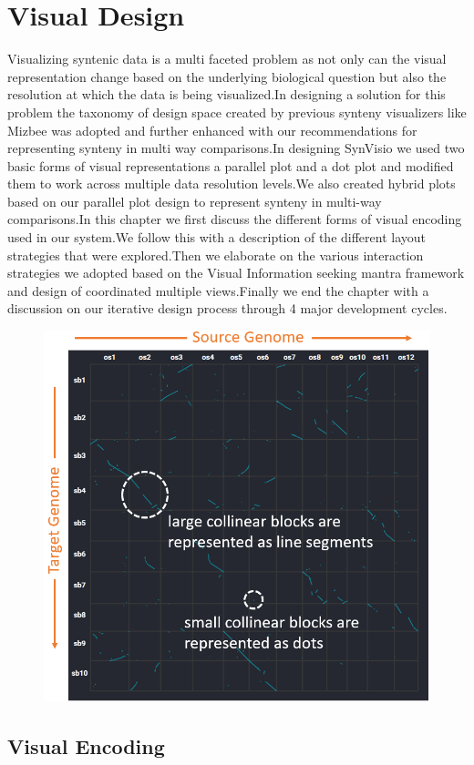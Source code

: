 \chapter{Visual Design}

Visualizing syntenic data is a multi faceted problem as not only can the visual representation change based on the underlying biological question but also the resolution at which the data is being visualized.In designing a solution for this problem the taxonomy of design space created by previous synteny visualizers like Mizbee \cite{Meyer2009} was adopted and further enhanced with our recommendations for representing synteny in multi way comparisons.In designing SynVisio we used two basic forms of visual representations a parallel plot and a dot plot and modified them to work across multiple data resolution levels.We also created hybrid plots based on our parallel plot design to represent synteny in multi-way comparisons.In this chapter we first discuss the different forms of visual encoding used in our system.We follow this with a  description of the different layout strategies that were explored.Then we elaborate on the various interaction strategies we adopted based on the Visual Information seeking mantra framework and design of coordinated multiple views.Finally we end the chapter with a discussion on our iterative design process through 4 major development cycles.

\begin{figure}[h]
  \centering
  \includegraphics[width=.475\linewidth]{images/ch_4_dot_plot_a.PNG}
  \label{fig:ch_4_dot_plot_a}
\end{figure}


\section{Visual Encoding}

